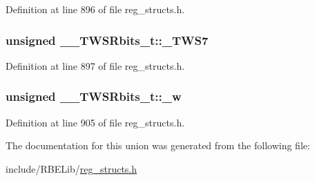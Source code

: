 Definition at line 896 of file reg\+\_\+structs.\+h.

\hypertarget{union_____t_w_s_rbits__t_a02d570d0d7b9b38d3ce547629d8c5597}{
\subsubsection[{\+\_\+\+T\+W\+S7}]{\setlength{\rightskip}{0pt plus 5cm}unsigned \+\_\+\+\_\+\+T\+W\+S\+Rbits\+\_\+t\+::\+\_\+\+T\+W\+S7}}\label{union_____t_w_s_rbits__t_a02d570d0d7b9b38d3ce547629d8c5597}


Definition at line 897 of file reg\+\_\+structs.\+h.

\hypertarget{union_____t_w_s_rbits__t_abbb70ccaf9eb3201c48f93002bb7a599}{
\subsubsection[{\+\_\+w}]{\setlength{\rightskip}{0pt plus 5cm}unsigned \+\_\+\+\_\+\+T\+W\+S\+Rbits\+\_\+t\+::\+\_\+w}}\label{union_____t_w_s_rbits__t_abbb70ccaf9eb3201c48f93002bb7a599}


Definition at line 905 of file reg\+\_\+structs.\+h.



The documentation for this union was generated from the following file\+:\begin{DoxyCompactItemize}
\item 
include/\+R\+B\+E\+Lib/\hyperlink{reg__structs_8h}{reg\+\_\+structs.\+h}\end{DoxyCompactItemize}
